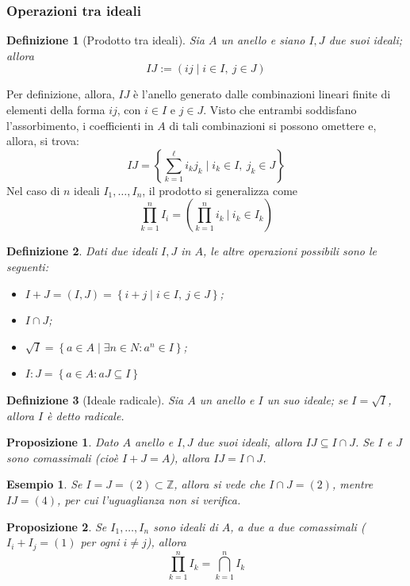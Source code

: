 \documentclass[12pt]{scrartcl}
\theoremstyle{style}
\newtheorem{esempio}{Esempio}[section]
\newtheorem{definizione}{Definizione}[section]
\newtheorem{prop}{Proposizione}[section]
\theoremstyle{style1}
\numberwithin{equation}{subsection}
\begin{document}
\subsubsection{Operazioni tra ideali}
\begin{definizione}
	[Prodotto tra ideali]
	Sia $A$ un anello e siano $I,J$ due suoi ideali; allora
	\[
	IJ := \left(ij  \mid i\in I, \ j\in J\right) 
	\] 
\end{definizione}
\noindent Per definizione, allora, $IJ$ \`e l'anello generato dalle combinazioni lineari finite di elementi della forma $ij$, con $i \in I$ e $j \in J$.
Visto che entrambi soddisfano l'assorbimento, i coefficienti in $A$ di tali combinazioni si possono omettere e, allora, si trova:
\begin{equation}
	IJ = \left\{ \sum_{k=1}^{\ell } i_kj_k \mid i_k \in I, \ j_k \in J \right\} 
\end{equation}
Nel caso di $n$ ideali $I_1,\ldots,I_n$, il prodotto si generalizza come
\[
\prod_{k=1} ^n I_i = \left(\prod_{k=1} ^n i_k  \ \Bigg\lvert \ i_k \in I_k\right) 
\] 
\begin{definizione}
	Dati due ideali $I,J$ in $A$, le altre operazioni possibili sono le seguenti:
	\begin{itemize}
		\item $I+J = (I,J) = \left\{ i+j  \mid i\in I, \ j \in J \right\} $;
		\item $I\cap J$;
		\item $\sqrt{I} = \left\{ a \in A  \mid \exists n \in N : a^n \in I \right\} $;
		\item $I:J = \left\{ a \in A :aJ \subseteq I \right\} $
	\end{itemize}
\end{definizione}
\begin{definizione}
	[Ideale radicale]
Sia $A$ un anello e $I$ un suo ideale; se $I = \sqrt{I} $, allora $I$ \`e detto \textit{radicale}.
\end{definizione}
\begin{prop}
	Dato $A$ anello e $I,J$ due suoi ideali, allora $IJ \subseteq I \cap J$.
	Se $I$ e $J$ sono comassimali (cio\`e $I+J = A$), allora $IJ = I \cap J$.
\end{prop}
\begin{esempio}
Se $I = J = (2) \subset \mathbb{Z}$, allora si vede che $I \cap J = (2)$, mentre $IJ = (4)$, per cui l'uguaglianza non si verifica.
\end{esempio}
\begin{prop}
Se $I_1,\ldots, I_n$ sono ideali di $A$, a due a due comassimali ($I_i+I_j = (1)$ per ogni $i\neq j$), allora
\[
\prod_{k=1} ^n I_k = \bigcap_{k=1} ^n I_k
\] 
\end{prop}
\end{document}
